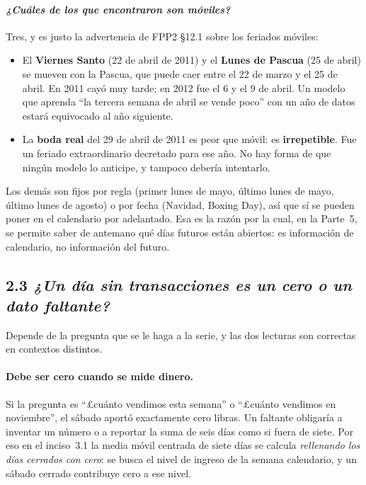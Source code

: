 \documentclass[11pt]{article}
\newcommand{\gbp}{\pounds}
\begin{document}
\paragraph{{\normalfont\itshape ¿Cu\'ales de los que encontraron son
m\'oviles?}} Tres, y es justo la advertencia de FPP2 \S12.1 sobre los
feriados m\'oviles:
\begin{itemize}[nosep,leftmargin=1.4em]
  \item El \textbf{Viernes Santo} (22 de abril de 2011) y el \textbf{Lunes
  de Pascua} (25 de abril) se mueven con la Pascua, que puede caer entre el
  22 de marzo y el 25 de abril. En 2011 cay\'o muy tarde; en 2012 fue el 6 y
  el 9 de abril. Un modelo que aprenda ``la tercera semana de abril se vende
  poco'' con un a\~no de datos estar\'a equivocado al a\~no siguiente.
  \item La \textbf{boda real} del 29 de abril de 2011 es peor que m\'ovil:
  es \textbf{irrepetible}. Fue un feriado extraordinario decretado para ese
  a\~no. No hay forma de que ning\'un modelo lo anticipe, y tampoco deber\'ia
  intentarlo.
\end{itemize}
Los dem\'as son fijos por regla (primer lunes de mayo, \'ultimo lunes de mayo,
\'ultimo lunes de agosto) o por fecha (Navidad, Boxing Day), as\'i que s\'i
se pueden poner en el calendario por adelantado. Esa es la raz\'on por la
cual, en la Parte~5, se permite saber de antemano qu\'e d\'ias futuros est\'an
abiertos: es informaci\'on de calendario, no informaci\'on del futuro.

\subsection{2.3 {\normalfont\itshape ¿Un d\'ia sin transacciones es un cero
o un dato faltante?}}

Depende de la pregunta que se le haga a la serie, y las dos lecturas son
correctas en contextos distintos.

\paragraph{Debe ser \textbf{cero} cuando se mide dinero.} Si la pregunta es
``\gbp cu\'anto vendimos esta semana'' o ``\gbp cu\'anto vendimos en
noviembre'', el s\'abado aport\'o exactamente cero libras. Un faltante
obligar\'ia a inventar un n\'umero o a reportar la suma de seis d\'ias como
si fuera de siete. Por eso en el inciso~3.1 la media m\'ovil centrada de
siete d\'ias se calcula \emph{rellenando los d\'ias cerrados con cero}: se
busca el nivel de ingreso de la semana calendario, y un s\'abado cerrado
contribuye cero a ese nivel.
\end{document}
